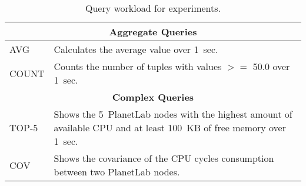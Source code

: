 \begin{table}[h!]
  \centering
  \renewcommand{\arraystretch}{1.5}
  \begin{tabular}{|m{3cm}|p{12cm}|}
    \hline
    \multicolumn{2}{|c|}{\bf Aggregate Queries} \\ 
    \hline\hline
    \textnormal{AVG}	&  Calculates the average value over 1~sec. \\ 
    \hline	  
    \textnormal{COUNT}	&  Counts the number of tuples with values $>=$ 50.0 over 1~sec.  \\  
    \hline\hline
    \multicolumn{2}{|c|}{\bf Complex Queries} \\ 
    \hline \hline
    \textnormal{TOP-5}	&  Shows the 5~PlanetLab nodes with the
    highest amount of available CPU and at least 100~KB of free memory over 1~sec.\\
    \hline	  
    \textnormal{COV} &  Shows the covariance of the CPU cycles consumption between two PlanetLab nodes.
    \\
    \hline	  
  \end{tabular}
  \caption{Query workload for experiments.}
  \label{table:queries}
\end{table}
